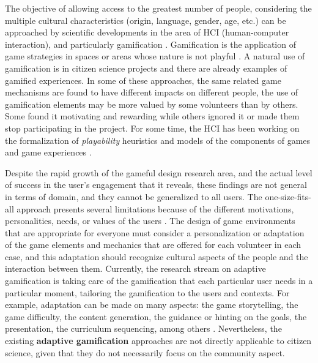 \documentclass[sigconf]{acmart}
\begin{document}
The objective of allowing access to the greatest number of people, considering the multiple cultural characteristics (origin, language, gender, age, etc.) can be approached by scientific developments in the area of HCI (human-computer interaction), and particularly gamification \cite{Preece2016}. Gamification is the application of game strategies in spaces or areas whose nature is not playful \cite{Deterding2011}. A natural use of gamification is in citizen science projects \cite{Kapp2013} and there are already examples of gamified experiences.  In some of these approaches, the same related game mechanisms are found to have different impacts on different people, the use of gamification elements may be more valued by some volunteers than by others. Some found it motivating and rewarding while others ignored it or made them stop participating in the project. 
For some time, the HCI has been working on the formalization of \textit{playability} heuristics and models of the components of games and game experiences \cite{Deterding2011}.




Despite the rapid growth of the gameful design research area, and the actual level of success in the user’s engagement that it reveals, these findings are not general in terms of domain, and they cannot be generalized to all users. The one-size-fits-all approach presents several limitations because of the different motivations, personalities, needs, or values of the users \cite{bockle_towards_2017}. The design of game environments that are appropriate for everyone must consider a personalization or adaptation of the game elements and mechanics that are offered  for each volunteer in each case, and this adaptation should recognize cultural aspects of the people and the interaction between them. Currently, the research stream on adaptive gamification is taking care of the gamification that each particular user needs in a particular moment, tailoring the gamification to the users and contexts\cite{klock2015gamification}. For example, adaptation can be made on many aspects: the game storytelling, the game difficulty, the content generation, the guidance or hinting on the goals, the presentation, the curriculum sequencing, among others \cite{gobel_personalization_2016}. Nevertheless, the existing \textbf{adaptive gamification} approaches are not directly applicable to citizen science, given that they do not necessarily focus on the community aspect.
\end{document}
